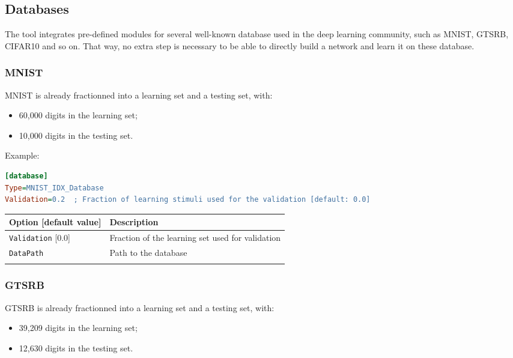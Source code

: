 \documentclass[a4paper,11pt,oneside]{article}
\newenvironment{myitemize}
{ \begin{itemize}
    \setlength{\itemsep}{0pt}
    \setlength{\parskip}{0pt}
    \setlength{\parsep}{0pt}     }
{ \end{itemize}                  }
\begin{document}
\subsection{Databases}

The tool integrates pre-defined modules for several well-known database used
in the deep learning community, such as MNIST, GTSRB, CIFAR10 and so on.
That way, no extra step is necessary to be able to directly build a network
and learn it on these database.

\subsubsection{MNIST}

MNIST \citep{LeCun1998} is already fractionned into a learning set and
a testing set, with:
\begin{myitemize}
\item 60,000 digits in the learning set;
\item 10,000 digits in the testing set.
\end{myitemize}

Example:
\begin{lstlisting}[language=ini]
[database]
Type=MNIST_IDX_Database
Validation=0.2  ; Fraction of learning stimuli used for the validation [default: 0.0]
\end{lstlisting}

\begin{center}
 \begin{tabular}{| p{5cm} | p{10cm} | }
 \hline
 Option [default value] & Description\\
 \hline\hline
  \lstinline!Validation! [0.0] & Fraction of the learning set used for
  validation \\
  \lstinline!DataPath! & Path to the database \\
   & \\
 \hline
\end{tabular}
\end{center}

\subsubsection{GTSRB}

GTSRB \citep{Stallkamp2012} is already fractionned into a learning set
and a testing set, with:
\begin{myitemize}
\item 39,209 digits in the learning set;
\item 12,630 digits in the testing set.
\end{myitemize}
\end{document}
